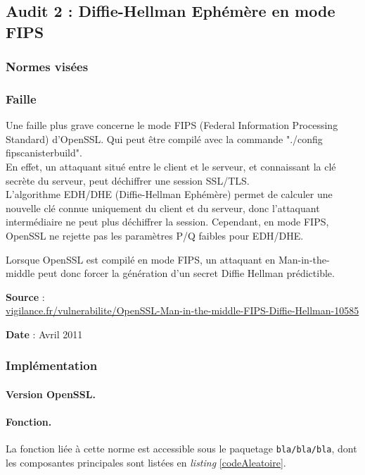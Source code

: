		
	\subsection{Audit 2 : Diffie-Hellman Ephémère en mode FIPS}
		\subsubsection{Normes visées}

	
		\subsubsection{Faille}
	
		Une faille plus grave concerne le mode FIPS (Federal Information 
		Processing Standard) d'OpenSSL.
		Qui peut être compilé avec la commande "./config fipscanisterbuild". \\

		En effet, un attaquant situé entre le client et le serveur, 
		et connaissant la clé secrète du serveur, peut déchiffrer une 
		session SSL/TLS. \\
	
		L'algorithme EDH/DHE (Diffie-Hellman Ephémère) permet de calculer 
		une nouvelle clé connue uniquement du client et du serveur, donc
		l'attaquant intermédiaire ne peut plus déchiffrer la session.
		Cependant, en mode FIPS, OpenSSL ne rejette pas les paramètres P/Q 
		faibles pour EDH/DHE.

		Lorsque OpenSSL est compilé en mode FIPS, un attaquant en Man-in-the-
		middle peut donc forcer la génération d'un secret Diffie Hellman 
		prédictible.

	\textbf{Source} : \\
	\href{http://vigilance.fr/vulnerabilite/OpenSSL-Man-in-the-middle-FIPS-Diffie-Hellman-10585}
	{vigilance.fr/vulnerabilite/OpenSSL-Man-in-the-middle-FIPS-Diffie-Hellman-10585}

	\textbf{Date} : Avril 2011	
	
		\subsubsection{Implémentation}
		
			\paragraph{Version OpenSSL.\\}
		
			\paragraph{Fonction.\\}
		La fonction liée à cette norme est accessible sous le paquetage \texttt{bla/bla/bla}, dont les composantes principales sont listées en \textit{listing} \ref{codeAleatoire}.
		
